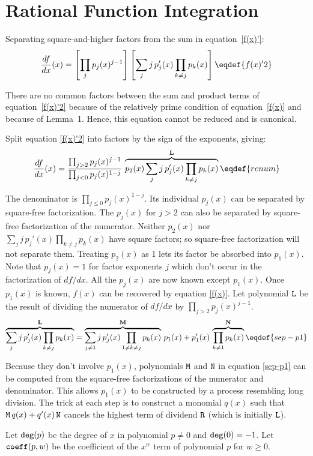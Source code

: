 \section{Rational Function Integration}

Separating square-and-higher factors from the sum in
equation~\eqref{f(x)'}:
$${d{f}\over d{x}}(x) = \left[ \prod_j p_j(x)^{j-1} \right]
\left[\sum_j j\,{p_j'}(x)\prod_{k\neq j} p_k(x)\right]\eqdef{f(x)'2}$$

There are no common factors between the sum and product terms of
equation~\eqref{f(x)'2} because of the relatively prime condition of
equation~\eqref{f(x)} and because of Lemma~1.  Hence, this equation
cannot be reduced and is canonical.

Split equation \eqref{f(x)'2} into factors by the sign of the exponents,
giving:
$${d{f}\over d{x}}(x)
 ={\prod_{j>2}p_j(x)^{j-1}\over\prod_{j<0} p_j(x)^{1-j}}\,
 \overbrace{p_2(x)\,{\sum_jj\,{p_j'}(x)\prod_{k\neq j}p_k(x)}}^{\bf L}
\eqdef{renum}$$

The denominator is $\prod_{j\le0} p_j(x)^{1-j}$.  Its individual
$p_j(x)$ can be separated by square-free factorization.  The $p_j(x)$
for $j>2$ can also be separated by square-free factorization of the
numerator.  Neither $p_2(x)$ nor
${\sum_jj\,{p_j'}(x)\prod_{k\neq{j}}p_k(x)}$ have square factors; so
square-free factorization will not separate them.  Treating $p_2(x)$
as 1 lets its factor be absorbed into $p_1(x)$.  Note that $p_j(x)=1$
for factor exponents $j$ which don't occur in the factorization of
$d{f}/d{x}$.  All the $p_j(x)$ are now known except $p_1(x)$.  Once
$p_1(x)$ is known, $f(x)$ can be recovered by equation \eqref{f(x)}.
Let polynomial ${\tt{L}}$ be the result of dividing the numerator of
$d{f}/d{x}$ by $\prod_{j>2}p_j(x)^{j-1}$.
$$\overbrace{\sum_jj\,{p_j'}(x)\prod_{k\neq j} p_k(x)}^{\bf L}=
  \overbrace{\sum_{j\ne1}j\,{p_j'}(x)\prod_{1\neq k\neq j}p_k(x)}^{{\bf M}}\,p_1(x)
  +{p_1'}(x)\,\overbrace{\prod_{k\neq1}p_k(x)}^{{\bf N}}\eqdef{sep-p1}$$

Because they don't involve $p_1(x)$, polynomials ${\tt{M}}$ and
${\tt{N}}$ in equation \eqref{sep-p1} can be computed from the
square-free factorizations of the numerator and denominator.  This
allows $p_1(x)$ to be constructed by a process resembling long
division.  The trick at each step is to construct a monomial $q(x)$
such that ${\tt{M}}\,q(x)+q'(x)\,{\tt{N}}$ cancels the highest term of
dividend ${\tt{R}}$ (which is initially ${\tt{L}}$).

Let ${\tt{deg}}(p)$ be the degree of $x$ in polynomial $p\ne0$ and
${\tt{deg}}(0)=-1$.  Let ${\tt{coeff}}(p,w)$ be the coefficient of the
$x^w$ term of polynomial $p$ for $w\ge0$.


